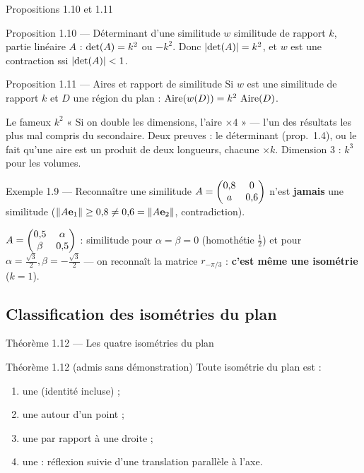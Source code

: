 \begin{frame}{Propositions 1.10 et 1.11}
  \begin{Enonce}{Proposition 1.10 --- Déterminant d'une similitude}
    \small $w$ similitude de rapport $k$, partie linéaire $A$ :
    $\operatorname{det}(A) = k^2$ ou $-k^2$. Donc $\lvert\operatorname{det}(A)\rvert = k^2$, et
    $w$ est une contraction ssi $\lvert\operatorname{det}(A)\rvert < 1$.
  \end{Enonce}
  \begin{Enonce}{Proposition 1.11 --- Aires et rapport de similitude}
    Si $w$ est une similitude de rapport $k$ et $D$ une région du
    plan : $\operatorname{Aire}(w(D)) = k^2\,\operatorname{Aire}(D)$.
  \end{Enonce}
  \begin{Classe}{Le fameux $k^2$}
    \small « Si on double les dimensions, l'aire $\times 4$ » --- l'un
    des résultats les plus mal compris du secondaire. Deux preuves : le
    déterminant (prop.~1.4), ou le fait qu'une aire est un produit de
    deux longueurs, chacune $\times k$. Dimension 3 : $k^3$ pour les
    volumes.
  \end{Classe}
\end{frame}

\begin{frame}{Exemple 1.9 --- Reconnaître une similitude}
  \small $A=\begin{pmatrix}0{,}8 & 0\\ a & 0{,}6\end{pmatrix}$ n'est \textbf{jamais} une
  similitude ($\lVert A\mathbf{e}_1 \rVert\geq 0{,}8 \neq 0{,}6=\lVert A\mathbf{e}_2 \rVert$, contradiction).

  \vspace{6pt}
  $A=\begin{pmatrix}0{,}5 & \alpha\\ \beta & 0{,}5\end{pmatrix}$ : similitude pour
  $\alpha=\beta=0$ (homothétie $\tfrac12$) et pour
  $\alpha=\tfrac{\sqrt3}2,\beta=-\tfrac{\sqrt3}2$ --- on reconnaît la
  matrice $r_{-\pi/3}$ : \textbf{c'est même une isométrie} ($k=1$).
\end{frame}

\subsection{Classification des isométries du plan}
\begin{frame}{Théorème 1.12 --- Les quatre isométries du plan}
  \begin{Enonce}{Théorème 1.12 (admis sans démonstration)}
    \small Toute isométrie du plan est :
    \begin{enumerate}
      \item une  (identité incluse) ;
      \item une  autour d'un point ;
      \item une  par rapport à une droite ;
      \item une  : réflexion suivie d'une
        translation parallèle à l'axe.
    \end{enumerate}
  \end{Enonce}
\end{frame}

